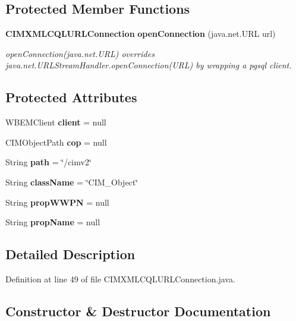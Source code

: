 \subsection*{Protected Member Functions}
\begin{DoxyCompactItemize}
\item 
{\bf C\+I\+M\+X\+M\+L\+C\+Q\+L\+U\+R\+L\+Connection} {\bf open\+Connection} (java.\+net.\+U\+R\+L url)
\begin{DoxyCompactList}\small\item\em open\+Connection(java.\+net.\+U\+R\+L) overrides java.\+net.\+U\+R\+L\+Stream\+Handler.\+open\+Connection(\+U\+R\+L) by wrapping a pgsql client. \end{DoxyCompactList}\end{DoxyCompactItemize}
\subsection*{Protected Attributes}
\begin{DoxyCompactItemize}
\item 
W\+B\+E\+M\+Client {\bf client} = null
\item 
C\+I\+M\+Object\+Path {\bf cop} = null
\item 
String {\bf path} = \char`\"{}/cimv2\char`\"{}
\item 
String {\bf class\+Name} = \char`\"{}C\+I\+M\+\_\+\+Object\char`\"{}
\item 
String {\bf prop\+W\+W\+P\+N} = null
\item 
String {\bf prop\+Name} = null
\end{DoxyCompactItemize}


\subsection{Detailed Description}


Definition at line 49 of file C\+I\+M\+X\+M\+L\+C\+Q\+L\+U\+R\+L\+Connection.\+java.



\subsection{Constructor \& Destructor Documentation}
